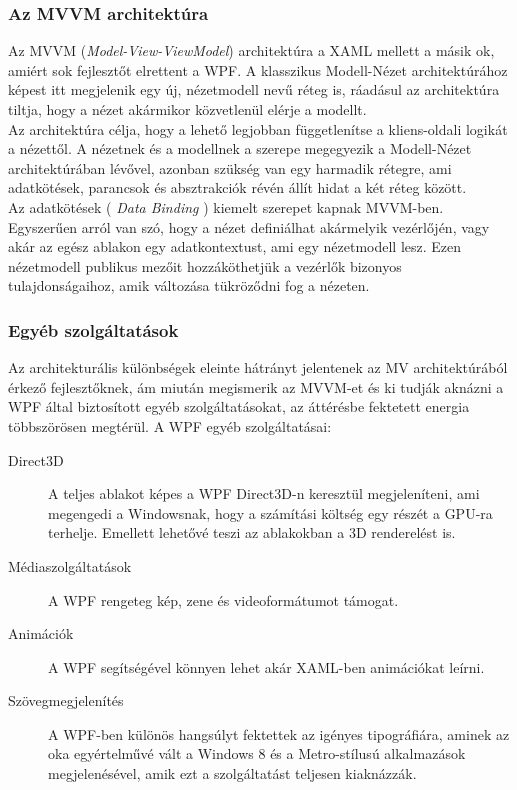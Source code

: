 \documentclass[a4paper,12pt]{report}
\begin{document}
\subsubsection{Az MVVM architektúra}
Az MVVM (\textit{Model-View-ViewModel})\cite{mvvm} architektúra a XAML mellett a másik ok, amiért sok fejlesztőt elrettent a WPF. A klasszikus Modell-Nézet architektúrához képest itt megjelenik egy új, nézetmodell nevű réteg is, ráadásul az architektúra tiltja, hogy a nézet akármikor közvetlenül elérje a modellt. \\
Az architektúra célja, hogy a lehető legjobban függetlenítse a kliens-oldali logikát a nézettől. A nézetnek és a modellnek a szerepe megegyezik a Modell-Nézet architektúrában lévővel, azonban szükség van egy harmadik rétegre, ami adatkötések, parancsok és absztrakciók révén állít hidat a két réteg között. \\
Az adatkötések ( \textit{Data Binding} ) kiemelt szerepet kapnak MVVM-ben. Egyszerűen arról van szó, hogy a nézet definiálhat akármelyik vezérlőjén, vagy akár az egész ablakon egy adatkontextust, ami egy nézetmodell lesz. Ezen nézetmodell publikus mezőit hozzáköthetjük a vezérlők bizonyos tulajdonságaihoz, amik változása tükröződni fog a nézeten.

\subsubsection{Egyéb szolgáltatások}
Az architekturális különbségek eleinte hátrányt jelentenek az MV architektúrából érkező fejlesztőknek, ám miután megismerik az MVVM-et és ki tudják aknázni a WPF által biztosított egyéb szolgáltatásokat, az áttérésbe fektetett energia többszörösen megtérül. A WPF egyéb szolgáltatásai:
\begin{description}
\item[Direct3D] A teljes ablakot képes a WPF Direct3D-n keresztül megjeleníteni, ami megengedi a Windowsnak, hogy a számítási költség egy részét a GPU-ra terhelje. Emellett lehetővé teszi az ablakokban a 3D renderelést is.
\item[Médiaszolgáltatások] A WPF rengeteg kép, zene és videoformátumot támogat.
\item[Animációk] A WPF segítségével könnyen lehet akár XAML-ben animációkat leírni.
\item[Szövegmegjelenítés] A WPF-ben különös hangsúlyt fektettek az igényes tipográfiára, aminek az oka egyértelművé vált a Windows 8 és a Metro-stílusú alkalmazások megjelenésével, amik ezt a szolgáltatást teljesen kiaknázzák.
\end{description}
\end{document}
